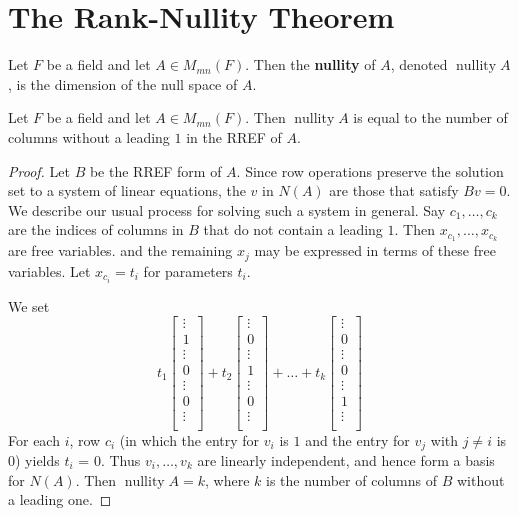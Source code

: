 \documentclass{article}
\DeclareMathOperator{\nullity}{nullity}
\begin{document}
  \section{The Rank-Nullity Theorem}
  \begin{definition}
    Let $F$ be a field and let $A \in M_{mn}(F)$. Then the \textbf{nullity} of $A$, denoted $\nullity A$, is the dimension of the null space of $A$.
  \end{definition}
  \begin{theorem}
    Let $F$ be a field and let $A \in M_{mn}(F)$. Then $\nullity A$ is equal to the number of columns without a leading $1$ in the RREF of $A$.
  \end{theorem}
  \begin{proof}
    Let $B$ be the RREF form of $A$. Since row operations preserve the solution set to a system of linear equations, the $v$ in $N(A)$ are those that satisfy $Bv = 0$. We describe our usual process for solving such a system in general. Say $c_1, \ldots, c_k$ are the indices of columns in $B$ that do not contain a leading $1$. Then $x_{c_1}, \ldots, x_{c_k}$ are free variables. and the remaining $x_j$ may be expressed in terms of these free variables. Let $x_{c_i} = t_i$ for parameters $t_i$.

    We set\[
      t_1
      \begin{bmatrix}
        \vdots\\
        1\\
        \vdots\\
        0\\
        \vdots\\
        0\\
        \vdots\\
      \end{bmatrix} + t_2
      \begin{bmatrix}
        \vdots\\
        0\\
        \vdots\\
        1\\
        \vdots\\
        0\\
        \vdots\\
      \end{bmatrix}+ \dots +  t_k
      \begin{bmatrix}
        \vdots\\
        0\\
        \vdots\\
        0\\
        \vdots\\
        1\\
        \vdots\\
      \end{bmatrix}
    \]
    For each $i$, row $c_i$ (in which the entry for $v_i$ is $1$ and the entry for $v_j$ with $j \neq i$ is $0$) yields $t_i$ = 0. Thus $v_i, \ldots, v_k$ are linearly independent, and hence form a basis for $N(A)$. Then $\nullity A = k$, where $k$ is the number of columns of $B$ without a leading one.
  \end{proof}
\end{document}
